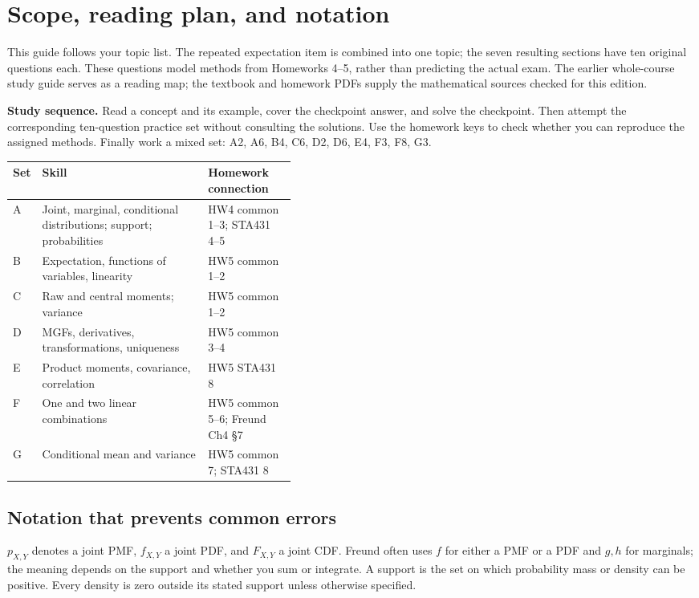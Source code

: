 \section*{Scope, reading plan, and notation}
This guide follows your topic list. The repeated expectation item is combined into one topic; the seven resulting sections have ten original questions each. These questions model methods from Homeworks 4--5, rather than predicting the actual exam. The earlier whole-course study guide serves as a reading map; the textbook and homework PDFs supply the mathematical sources checked for this edition.

\textbf{Study sequence.} Read a concept and its example, cover the checkpoint answer, and solve the checkpoint. Then attempt the corresponding ten-question practice set without consulting the solutions. Use the homework keys to check whether you can reproduce the assigned methods. Finally work a mixed set: A2, A6, B4, C6, D2, D6, E4, F3, F8, G3.

\begin{tabularx}{\linewidth}{@{}p{0.10\linewidth}Xp{0.31\linewidth}@{}}
\toprule Set & Skill & Homework connection\\\midrule
A & Joint, marginal, conditional distributions; support; probabilities & HW4 common 1--3; STA431 4--5\\
B & Expectation, functions of variables, linearity & HW5 common 1--2\\
C & Raw and central moments; variance & HW5 common 1--2\\
D & MGFs, derivatives, transformations, uniqueness & HW5 common 3--4\\
E & Product moments, covariance, correlation & HW5 STA431 8\\
F & One and two linear combinations & HW5 common 5--6; Freund Ch4 \S7\\
G & Conditional mean and variance & HW5 common 7; STA431 8\\\bottomrule
\end{tabularx}

\subsection*{Notation that prevents common errors}
$p_{X,Y}$ denotes a joint PMF, $f_{X,Y}$ a joint PDF, and $F_{X,Y}$ a joint CDF. Freund often uses $f$ for either a PMF or a PDF and $g,h$ for marginals; the meaning depends on the support and whether you sum or integrate. A support is the set on which probability mass or density can be positive. Every density is zero outside its stated support unless otherwise specified.

